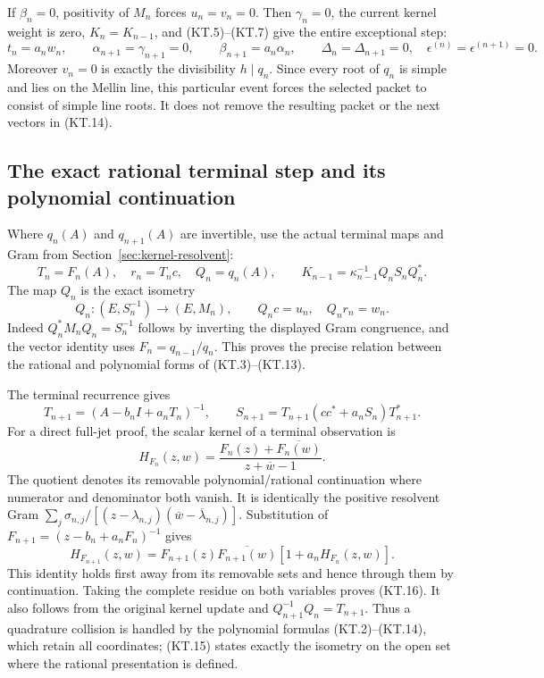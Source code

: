 If \(\beta_n=0\), positivity of \(M_n\) forces \(u_n=v_n=0\).
Then \(\gamma_n=0\), the current kernel weight is zero,
\(K_n=K_{n-1}\), and (KT.5)--(KT.7) give the entire exceptional
step:
\[
 t_n=a_nw_n,\qquad
 \alpha_{n+1}=\gamma_{n+1}=0,\qquad
 \beta_{n+1}=a_n\alpha_n,\qquad
 \Delta_n=\Delta_{n+1}=0,
 \quad\epsilon^{(n)}=\epsilon^{(n+1)}=0.                 \tag{KT.14}
\]
Moreover \(v_n=0\) is exactly the divisibility \(h\mid q_n\).
Since every root of \(q_n\) is simple and lies on the Mellin line,
this particular event forces the selected packet to consist of
simple line roots.  It does not remove the resulting packet or
the next vectors in (KT.14).

\subsection{The exact rational terminal step and its polynomial continuation}

Where \(q_n(A)\) and \(q_{n+1}(A)\) are invertible, use the
actual terminal maps and Gram from Section~\ref{sec:kernel-resolvent}:
\[
 T_n=F_n(A),\quad r_n=T_nc,\quad Q_n=q_n(A),\qquad
 K_{n-1}=\kappa_{n-1}^{-1}Q_nS_nQ_n^*.
\]
The map \(Q_n\) is the exact isometry
\[
 Q_n:(E,S_n^{-1})\longrightarrow(E,M_n),\qquad
 Q_nc=u_n,\quad Q_nr_n=w_n.                              \tag{KT.15}
\]
Indeed \(Q_n^*M_nQ_n=S_n^{-1}\) follows by inverting the
displayed Gram congruence, and the vector identity uses
\(F_n=q_{n-1}/q_n\).  This proves the precise relation between
the rational and polynomial forms of (KT.3)--(KT.13).

The terminal recurrence gives
\[
 T_{n+1}=(A-b_nI+a_nT_n)^{-1},\qquad
 \boxed{S_{n+1}=T_{n+1}(cc^*+a_nS_n)T_{n+1}^*.}          \tag{KT.16}
\]
For a direct full-jet proof, the scalar kernel of a terminal
observation is
\[
 H_{F_n}(z,w)=\frac{F_n(z)+\overline{F_n(w)}}
                        {z+\overline w-1}.
\]
The quotient denotes its removable polynomial/rational continuation
where numerator and denominator both vanish.  It is identically the
positive resolvent Gram
\(\sum_j\sigma_{n,j}/[(z-\lambda_{n,j})
(\overline w-\overline\lambda_{n,j})]\).
Substitution of \(F_{n+1}=(z-b_n+a_nF_n)^{-1}\) gives
\[
 H_{F_{n+1}}(z,w)=F_{n+1}(z)\overline{F_{n+1}(w)}
                           [1+a_nH_{F_n}(z,w)].         \tag{KT.17}
\]
This identity holds first away from its removable sets and hence
through them by continuation.  Taking the complete residue on both
variables proves (KT.16).  It also follows from the original
kernel update and \(Q_{n+1}^{-1}Q_n=T_{n+1}\).
Thus a quadrature collision is handled by the polynomial formulas
(KT.2)--(KT.14), which retain all coordinates; (KT.15) states
exactly the isometry on the open set where the rational presentation
is defined.

